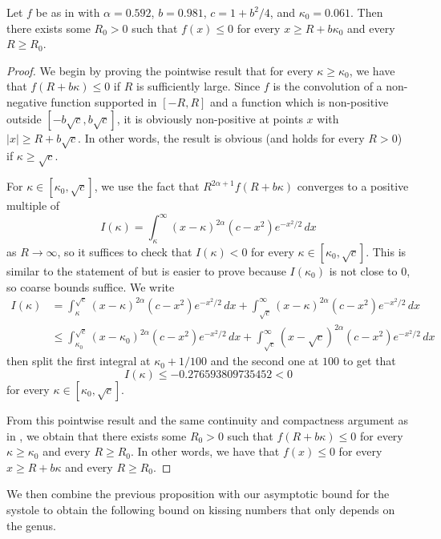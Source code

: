 \documentclass[12pt]{amsart}
\numberwithin{equation}{section}
\begin{document}
\begin{lem}
Let $f$ be as in  with $\alpha = 0.592$, $b = 0.981$, $c=1+b^2/4$, and $\kappa_0 = 0.061$. Then there exists some $R_0>0$ such that $f(x) \leq 0$ for every $x \geq R+b\kappa_0$ and every $R \geq R_0$. 
\end{lem}
\begin{proof}
We begin by proving the pointwise result that for every $\kappa \geq \kappa_0$, we have that $f(R+b\kappa) \leq 0$ if $R$ is sufficiently large. Since $f$ is the convolution of a non-negative function supported in $[-R,R]$ and a function which is non-positive outside $[-b\sqrt{c},b\sqrt{c}]$, it is obviously non-positive at points $x$ with $|x|\geq R+b\sqrt{c}$. In other words, the result is obvious (and holds for every $R>0$) if $\kappa \geq \sqrt{c}$. 

For $\kappa \in [\kappa_0,\sqrt{c}]$, we use the fact that $R^{2\alpha+1}f(R+b\kappa)$ converges to a positive multiple of
\[
I(\kappa)=\int_{\kappa}^\infty (x-\kappa)^{2\alpha}(c-x^2)e^{-x^2/2}\,dx
\]
as $R \to \infty$, so it suffices to check that $I(\kappa) <0$ for every $\kappa \in [\kappa_0,\sqrt{c}]$. This is similar to the statement of  but is easier to prove because $I(\kappa_0)$ is not close to $0$, so coarse bounds suffice. We write
\begin{align*}
I(\kappa) &= \int_{\kappa}^{\sqrt{c}} (x-\kappa)^{2\alpha}(c-x^2)e^{-x^2/2}\,dx + \int_{\sqrt{c}}^\infty (x-\kappa)^{2\alpha}(c-x^2)e^{-x^2/2}\,dx \\
& \leq \int_{\kappa_0}^{\sqrt{c}} (x-\kappa_0)^{2\alpha}(c-x^2)e^{-x^2/2}\,dx + \int_{\sqrt{c}}^\infty (x-\sqrt{c})^{2\alpha}(c-x^2)e^{-x^2/2}\,dx
\end{align*}
then split the first integral at $\kappa_0+1/100$ and the second one at $100$ to get that
\[
I(\kappa) \leq -0.276593809735452<0
\]
for every $\kappa \in [\kappa_0,\sqrt{c}]$.

From this pointwise result and the same continuity and compactness argument as in , we obtain that there exists some $R_0>0$ such that $f(R+b\kappa) \leq 0$ for every $\kappa \geq \kappa_0$ and every $R \geq R_0$. In other words, we have that $f(x)\leq 0$ for every $x \geq R+b\kappa$ and every $R \geq R_0$.
\end{proof}

We then combine the previous proposition with our asymptotic bound for the systole to obtain the following bound on kissing numbers that only depends on the genus.
\end{document}
